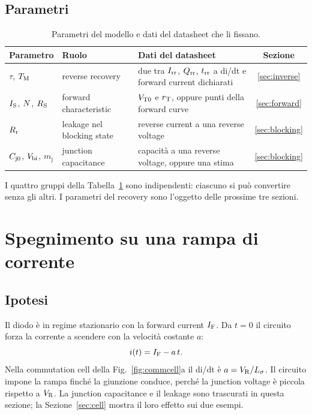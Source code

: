 \documentclass[10pt,a4paper]{scrartcl}
\let\newcommand\pdvaluedefine
\newcommand{\IF}{I_\mathrm{F}}
\newcommand{\VR}{V_\mathrm{R}}
\newcommand{\Irr}{I_\mathrm{rr}}
\newcommand{\Qrr}{Q_\mathrm{rr}}
\newcommand{\trr}{t_\mathrm{rr}}
\newcommand{\TM}{T_\mathrm{M}}
\newcommand{\IS}{I_\mathrm{S}}
\newcommand{\RS}{R_\mathrm{S}}
\newcommand{\Rr}{R_\mathrm{r}}
\newcommand{\VTo}{V_\mathrm{T0}}
\newcommand{\rT}{r_\mathrm{T}}
\newcommand{\Cjo}{C_\mathrm{j0}}
\newcommand{\Nem}{N}                          %
\newcommand{\Ls}{L_\sigma}                    %
\newcommand{\Vbi}{V_\mathrm{bi}}
\begin{document}
\subsection{Parametri}
\begin{table}[htb]
\centering\small
\caption{Parametri del modello e dati del datasheet che li fissano.}
\label{tab:params}
\begin{tabular}{@{}ll>{\raggedright\arraybackslash}p{6.4cm}c@{}}
\toprule
Parametro & Ruolo & Dati del datasheet & Sezione \\
\midrule
$\tau$, $\TM$ & reverse recovery & due tra $\Irr$, $\Qrr$, $\trr$ a di/dt e forward current dichiarati & \ref{sec:inverse} \\
$\IS$, $\Nem$, $\RS$ & forward characteristic & $\VTo$ e $\rT$, oppure punti della forward curve & \ref{sec:forward} \\
$\Rr$ & leakage nel blocking state & reverse current a una reverse voltage & \ref{sec:blocking} \\
$\Cjo$, $\Vbi$, $m_\mathrm{j}$ & junction capacitance & capacità a una reverse voltage, oppure una stima & \ref{sec:blocking} \\
\bottomrule
\end{tabular}
\end{table}
I quattro gruppi della Tabella~\ref{tab:params} sono indipendenti: ciascuno si può convertire senza gli altri. I parametri del recovery sono l'oggetto delle prossime tre sezioni.

\section{Spegnimento su una rampa di corrente}
\label{sec:ramp}
\subsection{Ipotesi}
Il diodo è in regime stazionario con la forward current $\IF$. Da $t = 0$ il circuito forza la corrente a scendere con la velocità costante $a$:
\begin{equation}
i(t) = \IF - a\,t .
\label{eq:ramp}
\end{equation}
Nella commutation cell della Fig.~\ref{fig:commcell}a il di/dt è $a = \VR/\Ls$. Il circuito impone la rampa finché la giunzione conduce, perché la junction voltage è piccola rispetto a $\VR$. La junction capacitance e il leakage sono trascurati in questa sezione; la Sezione~\ref{sec:cell} mostra il loro effetto sui due esempi.
\end{document}
